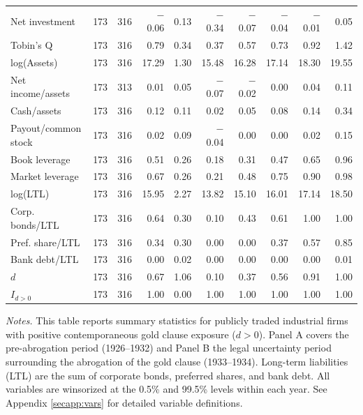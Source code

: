 \begin{table}[p]
\begin{threeparttable}
\begin{tabular}{lrrrrrrrrr}
            \midrule
            Net investment & 173 & 316 & $-$0.06 & 0.13 & $-$0.34 & $-$0.07 & $-$0.04 & $-$0.01 & 0.05 \\
            Tobin's Q & 173 & 316 & 0.79 & 0.34 & 0.37 & 0.57 & 0.73 & 0.92 & 1.42 \\
            log(Assets) & 173 & 316 & 17.29 & 1.30 & 15.48 & 16.28 & 17.14 & 18.30 & 19.55 \\
            Net income/assets & 173 & 313 & 0.01 & 0.05 & $-$0.07 & $-$0.02 & 0.00 & 0.04 & 0.11 \\
            Cash/assets & 173 & 316 & 0.12 & 0.11 & 0.02 & 0.05 & 0.08 & 0.14 & 0.34 \\
            Payout/common stock & 173 & 316 & 0.02 & 0.09 & $-$0.04 & 0.00 & 0.00 & 0.02 & 0.15 \\
            Book leverage & 173 & 316 & 0.51 & 0.26 & 0.18 & 0.31 & 0.47 & 0.65 & 0.96 \\
            Market leverage & 173 & 316 & 0.67 & 0.26 & 0.21 & 0.48 & 0.75 & 0.90 & 0.98 \\
            log(LTL) & 173 & 316 & 15.95 & 2.27 & 13.82 & 15.10 & 16.01 & 17.14 & 18.50 \\
            Corp. bonds/LTL & 173 & 316 & 0.64 & 0.30 & 0.10 & 0.43 & 0.61 & 1.00 & 1.00 \\
            Pref. share/LTL & 173 & 316 & 0.34 & 0.30 & 0.00 & 0.00 & 0.37 & 0.57 & 0.85 \\
            Bank debt/LTL & 173 & 316 & 0.00 & 0.02 & 0.00 & 0.00 & 0.00 & 0.00 & 0.01 \\
            \ensuremath{d} & 173 & 316 & 0.67 & 1.06 & 0.10 & 0.37 & 0.56 & 0.91 & 1.00 \\
            \ensuremath{I_{d>0}} & 173 & 316 & 1.00 & 0.00 & 1.00 & 1.00 & 1.00 & 1.00 & 1.00 \\
            \bottomrule
        \end{tabular}
    \end{threeparttable}

    \vspace*{3mm} \justifying \noindent
\scriptsize{\textit{Notes.} This table reports summary statistics for publicly traded industrial firms with positive contemporaneous gold clause exposure ($d > 0$). Panel A covers the pre-abrogation period (1926--1932) and Panel B the legal uncertainty period surrounding the abrogation of the gold clause (1933--1934). Long-term liabilities (LTL) are the sum of corporate bonds, preferred shares, and bank debt. All variables are winsorized at the 0.5\% and 99.5\% levels within each year. See Appendix \ref{secapp:vars} for detailed variable definitions.}
\end{table}